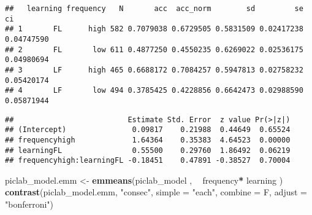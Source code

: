 \documentclass[
]{article}
\newenvironment{Shaded}{\begin{snugshade}}{\end{snugshade}}
\newcommand{\DataTypeTok}[1]{\textcolor[rgb]{0.13,0.29,0.53}{#1}}
\newcommand{\DecValTok}[1]{\textcolor[rgb]{0.00,0.00,0.81}{#1}}
\newcommand{\FloatTok}[1]{\textcolor[rgb]{0.00,0.00,0.81}{#1}}
\newcommand{\KeywordTok}[1]{\textcolor[rgb]{0.13,0.29,0.53}{\textbf{#1}}}
\newcommand{\NormalTok}[1]{#1}
\newcommand{\OperatorTok}[1]{\textcolor[rgb]{0.81,0.36,0.00}{\textbf{#1}}}
\newcommand{\StringTok}[1]{\textcolor[rgb]{0.31,0.60,0.02}{#1}}
\begin{document}
\begin{verbatim}
##   learning frequency   N       acc  acc_norm        sd         se         ci
## 1       FL      high 582 0.7079038 0.6729505 0.5831509 0.02417238 0.04747590
## 2       FL       low 611 0.4877250 0.4550235 0.6269022 0.02536175 0.04980694
## 3       LF      high 465 0.6688172 0.7084257 0.5947813 0.02758232 0.05420174
## 4       LF       low 494 0.3785425 0.4228856 0.6642473 0.02988590 0.05871944
\end{verbatim}

\begin{Shaded}
\end{Shaded}

\begin{verbatim}
##                          Estimate Std. Error  z value Pr(>|z|)
## (Intercept)               0.09817    0.21988  0.44649  0.65524
## frequencyhigh             1.64364    0.35383  4.64523  0.00000
## learningFL                0.55500    0.29760  1.86492  0.06219
## frequencyhigh:learningFL -0.18451    0.47891 -0.38527  0.70004
\end{verbatim}

\begin{Shaded}
\begin{Highlighting}[]
\NormalTok{piclab_model.emm <-}\StringTok{ }\KeywordTok{emmeans}\NormalTok{(piclab_model , }\OperatorTok{~}\StringTok{ }\NormalTok{frequency}\OperatorTok{*}\StringTok{ }\NormalTok{learning )}
\KeywordTok{contrast}\NormalTok{(piclab_model.emm, }\StringTok{"consec"}\NormalTok{,  }\DataTypeTok{simple =} \StringTok{"each"}\NormalTok{, }\DataTypeTok{combine =}\NormalTok{ F, }\DataTypeTok{adjust =} \StringTok{"bonferroni"}\NormalTok{)}
\end{Highlighting}
\end{Shaded}
\end{document}
